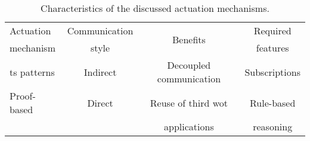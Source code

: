 
\begin{table}[htbp]
  \caption{Characteristics of the discussed actuation mechanisms.}
  \begin{center}
    \footnotesize
    \begin{tabular}{lccc}
      \hline
      Actuation &
      Communication & %
      \multirow{2}{*}{Benefits} &
      Required \\
      mechanism &
      style &
      ~ &
      features \\
      \hline
      \ac{ts} patterns & Indirect & Decoupled communication & Subscriptions \\
      Proof-based & Direct & Reuse of third \ac{wot} & Rule-based \\ %
      & & applications & reasoning \\ %
      \hline
    \end{tabular}
  \end{center}
  \label{tab:actuation_mechanisms}
\end{table}